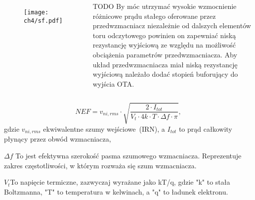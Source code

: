 \begin{frame}[t]
    \begin{block}{\dk}
    \end{block}

    \begin{columns}

        \begin{figure}[H]
            \texttt{[image: ch4/sf.pdf]}
        \end{figure}

TODO
        By móc utrzymać wysokie wzmocnienie różnicowe prądu stałego oferowane przez przedwzmacniacz niezależnie od dalszych elementów toru odczytowego powinien on zapewniać niską rezystancję wyjściową ze względu na możliwość obciążenia parametrów przedwzmacniacza.
        Aby układ przedwzmacniacza miał niską rezystancję wyjściową należało dodać stopień buforujący do wyjścia OTA.
    \end{columns} 

\end{frame}


\begin{frame}[t]
    \begin{block}{\dk}
    \end{block}
    \begin{equation}
        NEF = v_{ni,rms}\cdot\sqrt{\frac{2\cdot I_{tot}}{V_t\cdot 4k\cdot T \cdot \Delta f \cdot \pi}},
        \label{equ:NEF}
    \end{equation}
    gdzie $v_{ni,rms}$ ekwiwalentne szumy wejściowe~(IRN), a $I_{tot}$ to prąd całkowity płynący przez obwód wzmacniacza, 
    
 
    $\Delta f$ To jest efektywna szerokość pasma szumowego wzmacniacza. Reprezentuje zakres częstotliwości, w którym rozważa się szum wzmacniacza.

    $V_t$To napięcie termiczne, zazwyczaj wyrażane jako kT/q, gdzie "k" to stała Boltzmanna, "T" to temperatura w kelwinach, a "q" to ładunek elektronu.


\end{frame}




